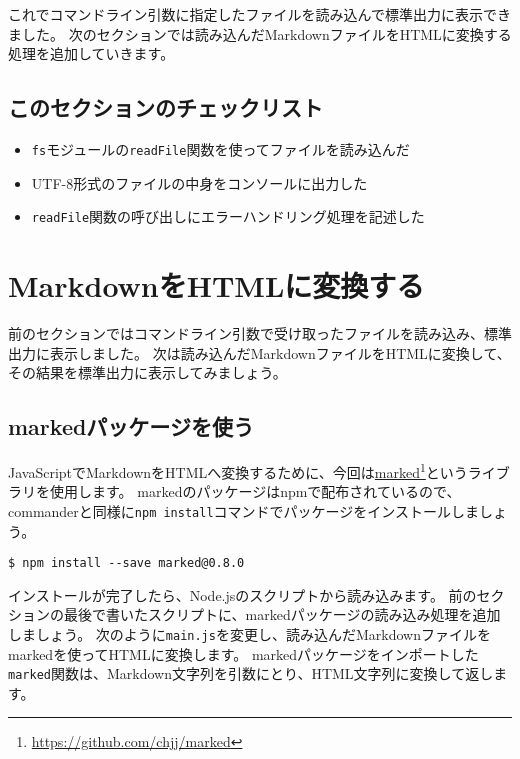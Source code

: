 これでコマンドライン引数に指定したファイルを読み込んで標準出力に表示できました。
次のセクションでは読み込んだMarkdownファイルをHTMLに変換する処理を追加していきます。

\hypertarget{section-checklist}{%
\subsection{このセクションのチェックリスト}\label{section-checklist}}

\begin{itemize}
\item
  \texttt{fs}モジュールの\texttt{readFile}関数を使ってファイルを読み込んだ
\item
  UTF-8形式のファイルの中身をコンソールに出力した
\item
  \texttt{readFile}関数の呼び出しにエラーハンドリング処理を記述した
\end{itemize}

\hypertarget{md-to-html}{%
\section{MarkdownをHTMLに変換する}\label{md-to-html}}

前のセクションではコマンドライン引数で受け取ったファイルを読み込み、標準出力に表示しました。
次は読み込んだMarkdownファイルをHTMLに変換して、その結果を標準出力に表示してみましょう。

\hypertarget{use-marked-package}{%
\subsection{markedパッケージを使う}\label{use-marked-package}}

JavaScriptでMarkdownをHTMLへ変換するために、今回は\href{https://github.com/chjj/marked}{marked}\footnote{\url{https://github.com/chjj/marked}}というライブラリを使用します。
markedのパッケージはnpmで配布されているので、commanderと同様に\texttt{npm install}コマンドでパッケージをインストールしましょう。

\begin{lstlisting}
$ npm install --save marked@0.8.0
\end{lstlisting}

インストールが完了したら、Node.jsのスクリプトから読み込みます。
前のセクションの最後で書いたスクリプトに、markedパッケージの読み込み処理を追加しましょう。
次のように\texttt{main.js}を変更し、読み込んだMarkdownファイルをmarkedを使ってHTMLに変換します。
markedパッケージをインポートした\texttt{marked}関数は、Markdown文字列を引数にとり、HTML文字列に変換して返します。

